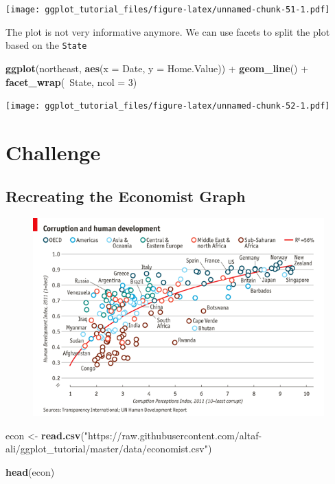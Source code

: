 \documentclass[]{article}
\newenvironment{Shaded}{\begin{snugshade}}{\end{snugshade}}
\newcommand{\KeywordTok}[1]{\textcolor[rgb]{0.13,0.29,0.53}{\textbf{{#1}}}}
\newcommand{\DataTypeTok}[1]{\textcolor[rgb]{0.13,0.29,0.53}{{#1}}}
\newcommand{\DecValTok}[1]{\textcolor[rgb]{0.00,0.00,0.81}{{#1}}}
\newcommand{\StringTok}[1]{\textcolor[rgb]{0.31,0.60,0.02}{{#1}}}
\newcommand{\NormalTok}[1]{{#1}}
\theoremstyle{definition}
\theoremstyle{definition}
\theoremstyle{definition}
\theoremstyle{remark}
\begin{document}
\texttt{[image: ggplot\_tutorial\_files/figure-latex/unnamed-chunk-51-1.pdf]}

The plot is not very informative anymore. We can use facets to split the
plot based on the \texttt{State}

\begin{Shaded}
\begin{Highlighting}[]
\KeywordTok{ggplot}\NormalTok{(northeast, }\KeywordTok{aes}\NormalTok{(}\DataTypeTok{x =} \NormalTok{Date, }\DataTypeTok{y =} \NormalTok{Home.Value)) +}
\StringTok{  }\KeywordTok{geom_line}\NormalTok{() +}
\StringTok{  }\KeywordTok{facet_wrap}\NormalTok{(~State, }\DataTypeTok{ncol =} \DecValTok{3}\NormalTok{)}
\end{Highlighting}
\end{Shaded}

\texttt{[image: ggplot\_tutorial\_files/figure-latex/unnamed-chunk-52-1.pdf]}

\section{Challenge}\label{challenge}

\subsection{Recreating the Economist
Graph}\label{recreating-the-economist-graph}

\begin{figure}[htbp]
\centering
\includegraphics{./img/economist.png}
\caption{}
\end{figure}

\begin{Shaded}
\begin{Highlighting}[]
\NormalTok{econ <-}\StringTok{ }\KeywordTok{read.csv}\NormalTok{(}\StringTok{"https://raw.githubusercontent.com/altaf-ali/ggplot_tutorial/master/data/economist.csv"}\NormalTok{)}

\KeywordTok{head}\NormalTok{(econ)}
\end{Highlighting}
\end{Shaded}
\end{document}
